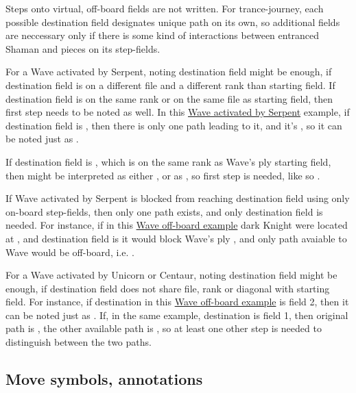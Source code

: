 Steps onto virtual, off-board fields are not written. For trance-journey, each possible destination field designates
unique path on its own, so additional fields are neccessary only if there is some kind of interactions between
entranced Shaman and pieces on its step-fields.

For a Wave activated by Serpent, noting destination field might be enough, if destination field is on a different file
and a different rank than starting field. If destination field is on the same rank or on the same file as starting field,
then first step needs to be noted as well. In this
\hyperref[fig:scn_tr_15_serpent_activated_wave_ply]{Wave activated by Serpent} example, if destination field is ,
then there is only one path leading to it, and it's , so it can be noted just as
.

If destination field is , which is on the same rank as Wave's ply starting field, then  might be
interpreted as either , or as , so first step is needed, like so
.

If Wave activated by Serpent is blocked from reaching destination field using only on-board step-fields, then only one
path exists, and only destination field is needed. For instance, if in this
\hyperref[fig:scn_tr_16_wave_out_of_board]{Wave off-board example} dark Knight were located at , and destination
field is  it would block Wave's ply , and only path avaiable to Wave would be
off-board, i.e. .

For a Wave activated by Unicorn or Centaur, noting destination field might be enough, if destination field does not share
file, rank or diagonal with starting field. For instance, if destination in this
\hyperref[fig:scn_mv_26_wave_off_board]{Wave off-board example} is field 2, then it can be noted just as .
If, in the same example, destination is field 1, then original path is , the other available
path is , so at least one other step is needed to distinguish between the two paths.

\subsection*{Move symbols, annotations}
\label{sec:Appendix/Notation/Move symbols, annotations}

